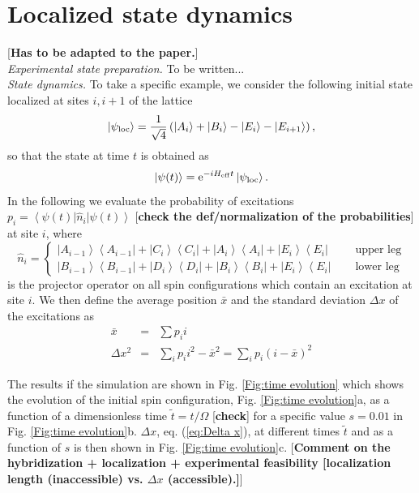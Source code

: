 \documentclass[prl,aps,twocolumn,showpacs,superscriptaddress,longbibliography]{revtex4-1}
\newcommand{\lan}{\left\langle}
\newcommand{\ran}{\right\rangle}
\newcommand{\ket}[1]{\left| #1 \ran}
\newcommand{\bra}[1]{\lan #1 \right|}
\begin{document}
\section{Localized state dynamics}

[{\bf Has to be adapted to the paper.}]\\

\emph{Experimental state preparation.} To be written...\\


\emph{State dynamics.} To take a specific example, we consider the following initial state localized at sites $i,i+1$ of the lattice
\begin{equation}
	\ket{\psi_{\rm loc}} =  \frac{1}{\sqrt{4}} \left( \ket{A_i} + \ket{B_i} - \ket{E_i} - \ket{E_{i+1}} \right),
	\label{eq:localized}
\end{equation}
so that the state at time $t$ is obtained as \cite{SM}
\begin{equation}
	\ket{\psi(t)} = {\rm e}^{-i H_{\rm eff} t} \ket{\psi_{\rm loc}}.
\end{equation}
In the following we evaluate the probability of excitations $p_i = \bra{\psi(t)} \hat{n}_i \ket{\psi(t)}$ [{\bf check the def/normalization of the probabilities}] at site $i$, where
\begin{equation}
	\hat{n}_i = 
	\begin{cases}
		\ket{A_{i-1}}\bra{A_{i-1}} + \ket{C_{i}}\bra{C_{i}} + \ket{A_{i}}\bra{A_{i}} + \ket{E_{i}}\bra{E_{i}} & \quad \text{ upper leg} \\
		\ket{B_{i-1}}\bra{B_{i-1}} + \ket{D_{i}}\bra{D_{i}} + \ket{B_{i}}\bra{B_{i}} + \ket{E_{i}}\bra{E_{i}} & \quad \text{ lower leg}
	\end{cases}
\end{equation}
is the projector operator on all spin configurations which contain an excitation at site $i$. We then define the average position $\bar{x}$ and the standard deviation $\Delta x$ of the excitations as
\begin{eqnarray}
	\bar{x} &=& \sum p_i i \\
	\Delta x^2 &=& \sum_i p_i i^2 - \bar{x}^2 = \sum_i p_i (i-\bar{x})^2
	\label{eq:Delta x}
\end{eqnarray}

The results if the simulation are shown in Fig. \ref{Fig:time evolution} which shows the evolution of the initial spin configuration, Fig. \ref{Fig:time evolution}a, as a function of a dimensionless time $\tilde{t}=t/\Omega$ [{\bf check}] for a specific value $s=0.01$ in Fig. \ref{Fig:time evolution}b. $\Delta x$, eq. (\ref{eq:Delta x}), at different times $\tilde{t}$ and as a function of $s$ is then shown in Fig. \ref{Fig:time evolution}c. [{\bf Comment on the hybridization + localization + experimental feasibility [localization length (inaccessible) vs. $\Delta x$ (accessible).]}]
\end{document}
